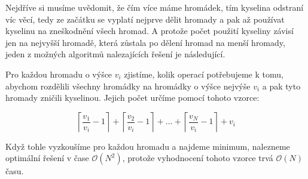 \documentclass{fkssolpub}
\author{Ondřej Sedláček}
\begin{document}
 

Nejdříve si musíme uvědomit, že čím více máme hromádek, tím kyselina
odstraní víc věcí, tedy ze začátku se vyplatí nejprve dělit hromady
a pak až používat kyselinu na zneškodnění všech hromad. A protože
počet použití kyseliny závisí jen na nejvyšší hromadě, která zůstala
po dělení hromad na menší hromady, jeden z možných algoritmů nalezajících
řešení je následující.

Pro každou hromadu o výšce $v_i$ zjistíme, kolik operací potřebujeme
k tomu, abychom rozdělili všechny hromádky na hromádky o výšce nejvýše
$v_i$ a pak tyto hromady zničili kyselinou. Jejich počet určíme pomocí
tohoto vzorce:

\[
  \left\lceil \frac{v_1}{v_i} - 1 \right\rceil
    + \left\lceil \frac{v_2}{v_i} - 1 \right\rceil + ...
    + \left\lceil \frac{v_N}{v_i} - 1 \right\rceil + v_i
\]

Když tohle vyzkoušíme pro každou hromadu a najdeme minimum, nalezneme
optimální řešení v čase $\mathcal{O}(N^2)$, protože vyhodnocení tohoto
vzorce trvá $\mathcal{O}(N)$ času.
\end{document}
